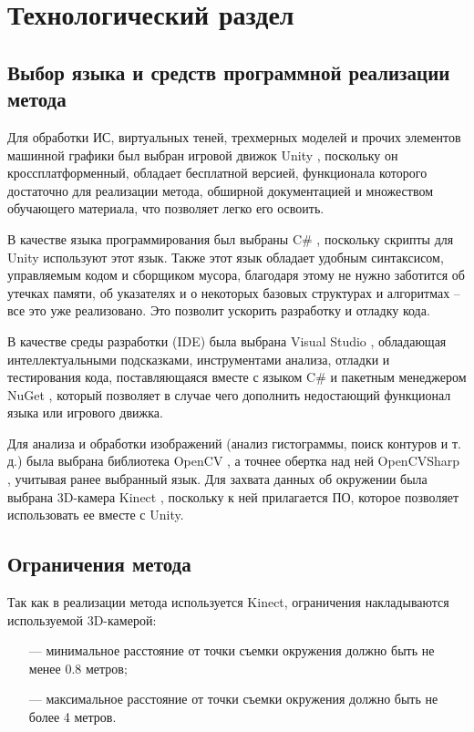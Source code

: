 \chapter{Технологический раздел}

\section{Выбор языка и средств программной реализации метода}

Для обработки ИС, виртуальных теней, трехмерных моделей и прочих элементов машинной графики был выбран игровой движок Unity \cite{unity}, поскольку он кроссплатформенный, обладает бесплатной версией, функционала которого достаточно для реализации метода, обширной документацией и множеством обучающего материала, что позволяет легко его освоить. 

В качестве языка программирования был выбраны C\# \cite{c-sharp}, поскольку скрипты для Unity используют этот язык. Также этот язык обладает удобным синтаксисом, управляемым кодом и сборщиком мусора, благодаря этому не нужно заботится об утечках памяти, об указателях и о некоторых базовых структурах и алгоритмах -- все это уже реализовано. Это позволит ускорить разработку и отладку кода.

В качестве среды разработки (IDE) была выбрана Visual Studio \cite{vs}, обладающая интеллектуальными подсказками, инструментами анализа, отладки и тестирования кода, поставляющаяся вместе с языком C\# и пакетным менеджером NuGet \cite{nuget}, который позволяет в случае чего дополнить недостающий функционал языка или игрового движка.

Для анализа и обработки изображений (анализ гистограммы, поиск контуров и т. д.) была выбрана библиотека OpenCV \cite{opencv}, а точнее обертка над ней OpenCVSharp \cite{opencvsharp}, учитывая ранее выбранный язык. Для захвата данных об окружении была выбрана 3D-камера Kinect \cite{kinect}, поскольку к ней прилагается ПО, которое позволяет использовать ее вместе с Unity.

\section{Ограничения метода}

Так как в реализации метода используется Kinect, ограничения накладываются используемой 3D-камерой:

\begin{itemize}
	\item[---] минимальное расстояние от точки съемки окружения должно быть не менее 0.8 метров;
	\item[---] максимальное расстояние от точки съемки окружения должно быть не более 4 метров.
\end{itemize}

